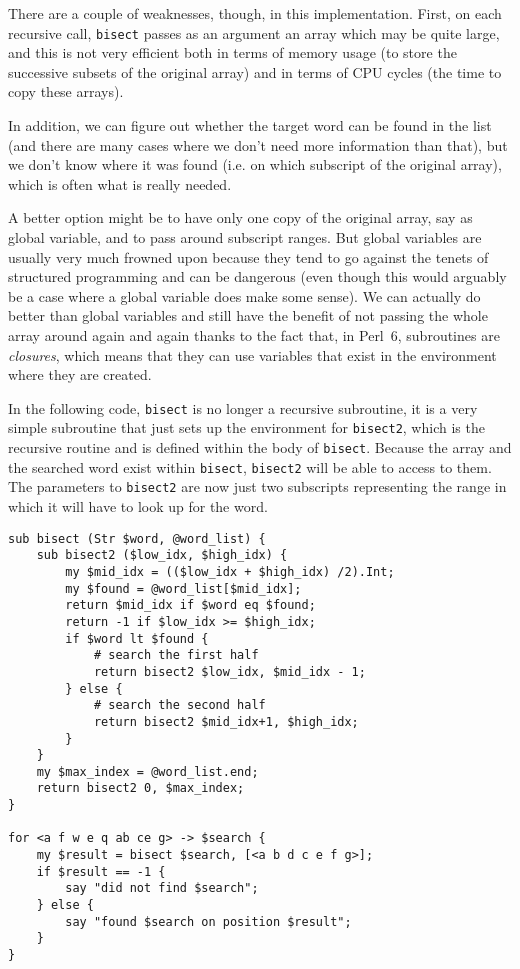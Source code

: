 There are a couple of weaknesses, though, in this 
implementation. First, on each recursive call, 
{\tt bisect} passes as an argument an array 
which may be quite large, and this is not very 
efficient both in terms of memory usage (to store 
the successive subsets of the original array) and 
in terms of CPU cycles (the time to copy these 
arrays).

In addition, we can figure out whether the target word can 
be found in the list (and there are many cases where 
we don't need more information than that), but we don't 
know where it was found (i.e. on which subscript of 
the original array), which is often what is really 
needed.

A better option might be to have only one copy of the 
original array, say as global variable, and to pass 
around subscript ranges. But global variables are 
usually very much frowned upon because they tend to go 
against the tenets of structured programming and can 
be dangerous (even though this would arguably be a 
case where a global variable does make some sense). 
We can actually do better than global 
variables and still have the benefit of not passing 
the whole array around again and again thanks to the 
fact that, in Perl~6, subroutines are \emph{closures}, 
which means that they can use variables that exist in 
the environment where they are created.

In the following code, {\tt bisect} is no longer a 
recursive subroutine, it is a very simple subroutine 
that just sets up the environment for {\tt bisect2},
which is the recursive routine and is defined within 
the body of {\tt bisect}. Because the array and the 
searched word exist within {\tt bisect}, {\tt bisect2} 
will be able to access to them. The parameters to 
{\tt bisect2} are now just two subscripts representing 
the range in which it will have to look up for the 
word.

\begin{verbatim}
sub bisect (Str $word, @word_list) {
    sub bisect2 ($low_idx, $high_idx) {
        my $mid_idx = (($low_idx + $high_idx) /2).Int;
        my $found = @word_list[$mid_idx];
        return $mid_idx if $word eq $found;
        return -1 if $low_idx >= $high_idx;
        if $word lt $found {
            # search the first half
            return bisect2 $low_idx, $mid_idx - 1;
        } else {
            # search the second half
            return bisect2 $mid_idx+1, $high_idx;
        }
    }
    my $max_index = @word_list.end;
    return bisect2 0, $max_index;
}

for <a f w e q ab ce g> -> $search { 
    my $result = bisect $search, [<a b d c e f g>];
    if $result == -1 {
        say "did not find $search";
    } else {
        say "found $search on position $result";
    }
}
\end{verbatim}

